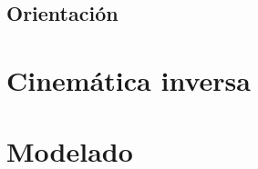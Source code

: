 \subsection{Orientación}

\section{Cinemática inversa}

\section{Modelado}

\begin{lstlisting}[frame=single]
    % Declaracion de las variables simbolicas
\end{lstlisting}